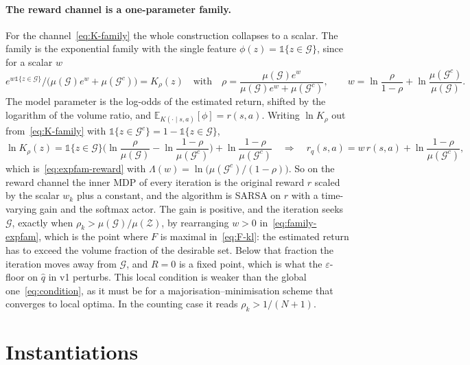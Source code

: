 \documentclass[11pt]{article}
\theoremstyle{remark}
\newcommand{\Zcal}{\mathcal Z}
\newcommand{\Gcal}{\mathcal G}
\newcommand{\E}{\mathbb E}
\newcommand{\1}{\mathds{1}}
\newcommand{\new}[1]{\textcolor{blue!70!black}{#1}}
\begin{document}
\paragraph{\new{The reward channel is a one-parameter family.}}
{\color{blue!70!black}
For the channel~\eqref{eq:K-family} the whole construction collapses to a scalar.
The family is the exponential family with the single feature $\phi(z)=\1\{z\in \Gcal\}$, since for a scalar $w$
\begin{equation}
  e^{w\1\{z\in \Gcal\}}\big/\big(\mu(\Gcal)e^{w}+\mu(\Gcal^c)\big)=K_\rho(z)
  \quad\text{with}\quad
  \rho=\frac{\mu(\Gcal)e^{w}}{\mu(\Gcal)e^{w}+\mu(\Gcal^c)},
  \qquad
  w=\ln\frac{\rho}{1-\rho}+\ln\frac{\mu(\Gcal^c)}{\mu(\Gcal)} .
  \label{eq:family-expfam}
\end{equation}
The model parameter is the log-odds of the estimated return, shifted by the logarithm of the volume ratio, and $\E_{K(\cdot\mid s,a)}[\phi]=r(s,a)$.
Writing $\ln K_\rho$ out from~\eqref{eq:K-family} with $\1\{z\in \Gcal^c\}=1-\1\{z\in \Gcal\}$,
\begin{equation}
  \ln K_\rho(z)=\1\{z\in \Gcal\}\Big(\ln\frac{\rho}{\mu(\Gcal)}-\ln\frac{1-\rho}{\mu(\Gcal^c)}\Big)+\ln\frac{1-\rho}{\mu(\Gcal^c)}
  \quad\Longrightarrow\quad
  r_q(s,a)=w\,r(s,a)+\ln\frac{1-\rho}{\mu(\Gcal^c)} ,
  \label{eq:family-reward}
\end{equation}
which is~\eqref{eq:expfam-reward} with $\Lambda(w)=\ln\big(\mu(\Gcal^c)/(1-\rho)\big)$.
So on the reward channel the inner MDP of every iteration is the original reward $r$ scaled by the scalar $w_k$ plus a constant, and the algorithm is SARSA on $r$ with a time-varying gain and the softmax actor.
The gain is positive, and the iteration seeks $\Gcal$, exactly when $\rho_k>\mu(\Gcal)/\mu(\Zcal)$, by rearranging $w>0$ in~\eqref{eq:family-expfam}, which is the point where $F$ is maximal in~\eqref{eq:F-kl}: the estimated return has to exceed the volume fraction of the desirable set.
Below that fraction the iteration moves away from $\Gcal$, and $R=0$ is a fixed point, which is what the $\varepsilon$-floor on $\hat q$ in v1 perturbs.
This local condition is weaker than the global one~\eqref{eq:condition}, as it must be for a majorisation--minimisation scheme that converges to local optima.
In the counting case it reads $\rho_k>1/(N+1)$.
}


\section{Instantiations}
\label{sec:inst}
\end{document}
